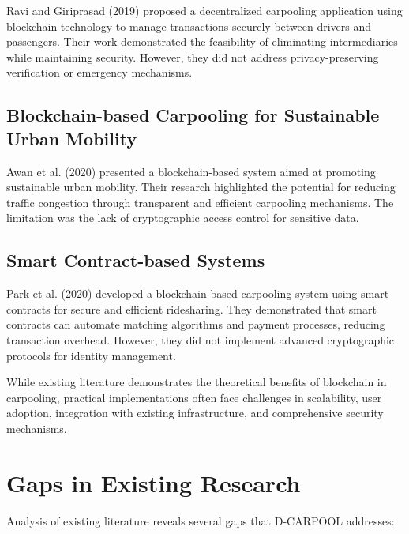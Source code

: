 Ravi and Giriprasad (2019) proposed a decentralized carpooling application using blockchain technology to manage transactions securely between drivers and passengers. Their work demonstrated the feasibility of eliminating intermediaries while maintaining security. However, they did not address privacy-preserving verification or emergency mechanisms.

\subsection{Blockchain-based Carpooling for Sustainable Urban Mobility}

Awan et al. (2020) presented a blockchain-based system aimed at promoting sustainable urban mobility. Their research highlighted the potential for reducing traffic congestion through transparent and efficient carpooling mechanisms. The limitation was the lack of cryptographic access control for sensitive data.

\subsection{Smart Contract-based Systems}

Park et al. (2020) developed a blockchain-based carpooling system using smart contracts for secure and efficient ridesharing. They demonstrated that smart contracts can automate matching algorithms and payment processes, reducing transaction overhead. However, they did not implement advanced cryptographic protocols for identity management.

\begin{remark}
While existing literature demonstrates the theoretical benefits of blockchain in carpooling, practical implementations often face challenges in scalability, user adoption, integration with existing infrastructure, and comprehensive security mechanisms.
\end{remark}

\section{Gaps in Existing Research}

Analysis of existing literature reveals several gaps that D-CARPOOL addresses:

